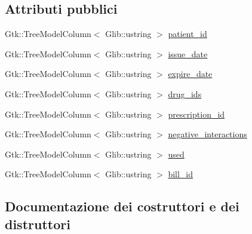 \subsection*{Attributi pubblici}
\begin{DoxyCompactItemize}
\item 
Gtk\+::\+Tree\+Model\+Column$<$ Glib\+::ustring $>$ \hyperlink{structmm_1_1model_1_1_prescription_1_1_tree_model_a814d7cb9f3f9abe35883bab3c56bc328}{patient\+\_\+id}
\item 
Gtk\+::\+Tree\+Model\+Column$<$ Glib\+::ustring $>$ \hyperlink{structmm_1_1model_1_1_prescription_1_1_tree_model_ab999486fd371dff7158dcf40f6ef003e}{issue\+\_\+date}
\item 
Gtk\+::\+Tree\+Model\+Column$<$ Glib\+::ustring $>$ \hyperlink{structmm_1_1model_1_1_prescription_1_1_tree_model_a51a87cac9a623149e021404730aed780}{expire\+\_\+date}
\item 
Gtk\+::\+Tree\+Model\+Column$<$ Glib\+::ustring $>$ \hyperlink{structmm_1_1model_1_1_prescription_1_1_tree_model_a57ca54db8aa2c95df49cc1c12b1ec48a}{drug\+\_\+ids}
\item 
Gtk\+::\+Tree\+Model\+Column$<$ Glib\+::ustring $>$ \hyperlink{structmm_1_1model_1_1_prescription_1_1_tree_model_ab9c6e53985f8fba26f6b423ba4e3e12c}{prescription\+\_\+id}
\item 
Gtk\+::\+Tree\+Model\+Column$<$ Glib\+::ustring $>$ \hyperlink{structmm_1_1model_1_1_prescription_1_1_tree_model_a12e1a81bee0d65dd04ab6aa7111d486b}{negative\+\_\+interactions}
\item 
Gtk\+::\+Tree\+Model\+Column$<$ Glib\+::ustring $>$ \hyperlink{structmm_1_1model_1_1_prescription_1_1_tree_model_abaa5eab3650e690c64385bd364526250}{used}
\item 
Gtk\+::\+Tree\+Model\+Column$<$ Glib\+::ustring $>$ \hyperlink{structmm_1_1model_1_1_prescription_1_1_tree_model_ac2c97db08c6a4b24f124b4c1fd8aeaf5}{bill\+\_\+id}
\end{DoxyCompactItemize}


\subsection{Documentazione dei costruttori e dei distruttori}
\mbox{\label{structmm_1_1model_1_1_prescription_1_1_tree_model_a3b6f84fdc2b7a9f83e4c9ec7594a534d}} 
